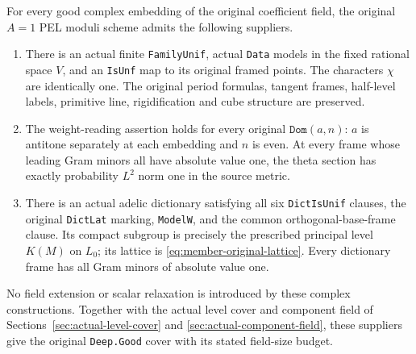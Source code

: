 \begin{theorem}\label{thm:actual-normalized-member}
For every good complex embedding of the original coefficient field,
the original $A=1$ PEL moduli scheme admits the following suppliers.
\begin{enumerate}
\item There is an actual finite \texttt{FamilyUnif}, actual
\texttt{Data} models in the fixed rational space $V$, and an
\texttt{IsUnf} map to its original framed points.  The characters
$\chi$ are identically one.  The original period formulas, tangent
frames, half-level labels, primitive line, rigidification and cube
structure are preserved.
\item The weight-reading assertion holds for every original
$\texttt{Dom}(a,n)$: $a$ is antitone separately at each embedding
and $n$ is even.  At every frame whose leading Gram minors all have
absolute value one, the theta section has exactly probability
$L^2$ norm one in the source metric.
\item There is an actual adelic dictionary satisfying all six
\texttt{DictIsUnif} clauses, the original \texttt{DictLat} marking,
\texttt{ModelW}, and the common orthogonal-base-frame clause.
Its compact subgroup is precisely the prescribed principal level
$K(M)$ on $L_0$; its lattice is \eqref{eq:member-original-lattice}.
Every dictionary frame has all Gram minors of absolute value one.
\end{enumerate}
No field extension or scalar relaxation is introduced by these complex
constructions.  Together with the actual level cover and component
field of Sections~\ref{sec:actual-level-cover} and
\ref{sec:actual-component-field}, these suppliers give the original
\texttt{Deep.Good} cover with its stated field-size budget.
\end{theorem}

